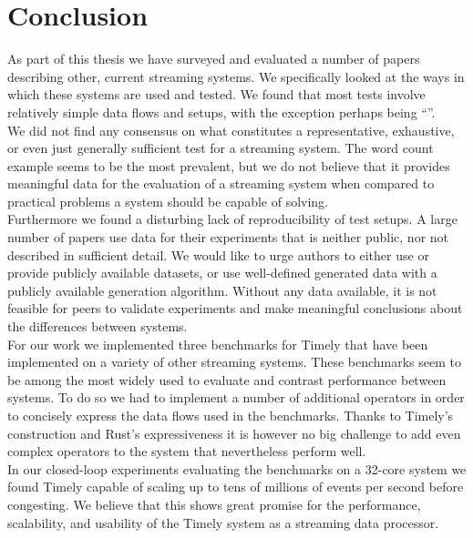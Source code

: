 \section{Conclusion}
As part of this thesis we have surveyed and evaluated a number of papers describing other, current streaming systems. We specifically looked at the ways in which these systems are used and tested. We found that most tests involve relatively simple data flows and setups, with the exception perhaps being ``''\cite{storm2}. \\

We did not find any consensus on what constitutes a representative, exhaustive, or even just generally sufficient test for a streaming system. The word count example seems to be the most prevalent, but we do not believe that it provides meaningful data for the evaluation of a streaming system when compared to practical problems a system should be capable of solving. \\

Furthermore we found a disturbing lack of reproducibility of test setups. A large number of papers use data for their experiments that is neither public, nor not described in sufficient detail. We would like to urge authors to either use or provide publicly available datasets, or use well-defined generated data with a publicly available generation algorithm. Without any data available, it is not feasible for peers to validate experiments and make meaningful conclusions about the differences between systems. \\

For our work we implemented three benchmarks for Timely that have been implemented on a variety of other streaming systems. These benchmarks seem to be among the most widely used to evaluate and contrast performance between systems. To do so we had to implement a number of additional operators in order to concisely express the data flows used in the benchmarks. Thanks to Timely's construction and Rust's expressiveness it is however no big challenge to add even complex operators to the system that nevertheless perform well. \\

In our closed-loop experiments evaluating the benchmarks on a 32-core system we found Timely capable of scaling up to tens of millions of events per second before congesting. We believe that this shows great promise for the performance, scalability, and usability of the Timely system as a streaming data processor. \\

